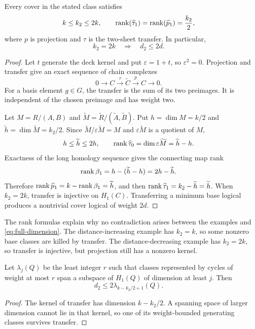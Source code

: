 \begin{proposition}\label{prop:ranks}
Every cover in the stated class satisfies
\begin{equation}\label{eq:dimension-bounds}
 k\le k_2\le2k,\qquad
 \operatorname{rank}(\widehat\tau_1)=\operatorname{rank}(\widehat p_1)=\frac{k_2}{2},
\end{equation}
where $p$ is projection and $\tau$ is the two-sheet transfer. In particular,
\begin{equation}\label{eq:full-dimension}
 k_2=2k\quad\Longrightarrow\quad d_2\le2d.
\end{equation}
\end{proposition}
\begin{proof}
Let $t$ generate the deck kernel and put $\varepsilon=1+t$, so $\varepsilon^2=0$. Projection and transfer give an exact sequence of chain complexes
\[
 0\longrightarrow C\xrightarrow{\tau}\widetilde C\xrightarrow p C\longrightarrow0.
\]
For a basis element $g\in G$, the transfer is the sum of its two preimages. It is independent of the chosen preimage and has weight two.

Let $M=R/(A,B)$ and $\widetilde M=\widetilde R/(\widetilde A,\widetilde B)$. Put $h=\dim M=k/2$ and $\widetilde h=\dim\widetilde M=k_2/2$. Since $\widetilde M/\varepsilon\widetilde M=M$ and $\varepsilon\widetilde M$ is a quotient of $M$,
\[
 h\le\widetilde h\le2h,\qquad
 \operatorname{rank}\widehat\tau_0=\dim\varepsilon\widetilde M=\widetilde h-h.
\]
Exactness of the long homology sequence gives the connecting map rank
\[
 \operatorname{rank}\beta_1=h-(\widetilde h-h)=2h-\widetilde h.
\]
Therefore $\operatorname{rank}\widehat p_1=k-\operatorname{rank}\beta_1=\widetilde h$, and then $\operatorname{rank}\widehat\tau_1=k_2-\widetilde h=\widetilde h$. When $k_2=2k$, transfer is injective on $H_1(C)$. Transferring a minimum base logical produces a nontrivial cover logical of weight $2d$.
\end{proof}

The rank formulas explain why no contradiction arises between the examples and \eqref{eq:full-dimension}. The distance-increasing example has $k_2=k$, so some nonzero base classes are killed by transfer. The distance-decreasing example has $k_2=2k$, so transfer is injective, but projection still has a nonzero kernel.

\begin{proposition}\label{prop:lambda}
Let $\lambda_j(Q)$ be the least integer $r$ such that classes represented by cycles of weight at most $r$ span a subspace of $H_1(Q)$ of dimension at least $j$. Then
\[
 d_2\le2\lambda_{k-k_2/2+1}(Q).
\]
\end{proposition}
\begin{proof}
The kernel of transfer has dimension $k-k_2/2$. A spanning space of larger dimension cannot lie in that kernel, so one of its weight-bounded generating classes survives transfer.
\end{proof}

